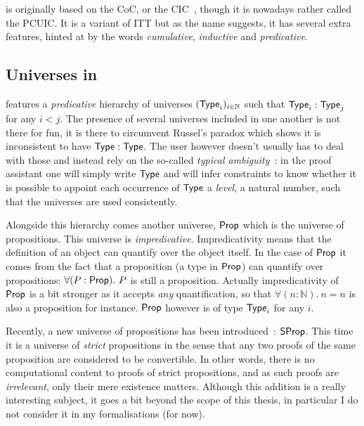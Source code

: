 \Coq is originally based on the \acrfull{CoC}, or the
\acrfull{CIC}~, though it is nowadays rather
called the \acrfull{PCUIC}.
It is a variant of \acrshort{ITT} but as the name suggests, it has several
extra features, hinted at by the words \emph{cumulative}, \emph{inductive}
and \emph{predicative}.

\subsection{Universes in \Coq}

\Coq features a \emph{predicative} hierarchy of universes
\((\mathsf{Type}_i)_{i \in \mathbb{N}}\) such that \(\mathsf{Type}_i : \mathsf{Type}_j\) for any
\(i < j\). The presence of several universes included in one another is not
there for fun, it is there to circumvent Russel's paradox which
shows it is inconsistent to have \(\mathsf{Type} : \mathsf{Type}\).
The \Coq user however doesn't usually has to deal with those and
instead rely on the so-called
\emph{typical ambiguity}~:
in the \Coq proof assistant one will simply write \(\mathsf{Type}\) and \Coq will infer
constraints to know whether it is possible to appoint each occurrence of
\(\mathsf{Type}\) a \emph{level}, \ie a natural number, such that the universes are used
consistently.

Alongside this hierarchy comes another universe, \(\mathsf{Prop}\) which is the universe
of propositions. This universe is \emph{impredicative}.
Impredicativity means that the definition of an object can quantify over the
object itself. In the case of \(\mathsf{Prop}\) it comes from the fact that a
proposition (\ie a type in \(\mathsf{Prop}\)) can quantify over propositions: \eg
\(\forall (P : \mathsf{Prop}).\ P\) is still a proposition.
Actually impredicativity of \(\mathsf{Prop}\) is a bit stronger as it accepts \emph{any}
quantification, so that \(\forall (n : \mathbb{N}).\ n = n\) is also a
proposition for instance.
\(\mathsf{Prop}\) however is of type \(\mathsf{Type}_i\) for any \(i\).

Recently, a new universe of propositions has been
introduced~: \(\mathsf{SProp}\).
This time it is a universe of \emph{strict} propositions in the sense that any
two proofs of the same proposition are considered to be convertible.
In other words, there is no computational content to proofs of strict
propositions, and as such proofs are \emph{irrelevant}, only their mere
existence matters.
Although this addition is a really interesting subject, it goes a bit beyond
the scope of this thesis, in particular I do not consider it in my
formalisations (for now).

